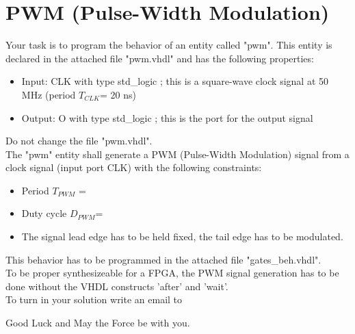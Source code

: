 \documentclass[a4paper,12pt]{article}
\begin{document}
\pagestyle{empty}
\setlength{\parindent}{0em} 
\section*{PWM (Pulse-Width Modulation)}
Your task is to program the behavior of an entity called "pwm". This entity is declared in the attached file "pwm.vhdl" and has the following properties:

\begin{itemize}
\item Input:  CLK with type std\_logic ; this is a square-wave clock signal at 50 MHz (period $T_{CLK}$= 20 ns)
\item Output: O with type std\_logic ; this is the port for the output signal
\end{itemize}
\begin{center}
\end{center}

Do not change the file "pwm.vhdl".
\\

The "pwm" entity shall generate a PWM (Pulse-Width Modulation) signal from a clock signal (input port CLK) with the following constraints:
\begin{itemize}
\item Period $T_{PWM}$ = %
\item Duty cycle $D_{PWM}$= %
\item The signal lead edge has to be held fixed, the tail edge has to be modulated.
\end{itemize}
\vspace{0.3cm}

This behavior has to be programmed in the attached file "gates\_beh.vhdl".
\\

To be proper synthesizeable for a FPGA, the PWM signal generation has to be done without the VHDL constructs 'after' and 'wait'.
\\

To turn in your solution write an email to %

\vspace{0.7cm}

Good Luck and May the Force be with you.
\end{document}
